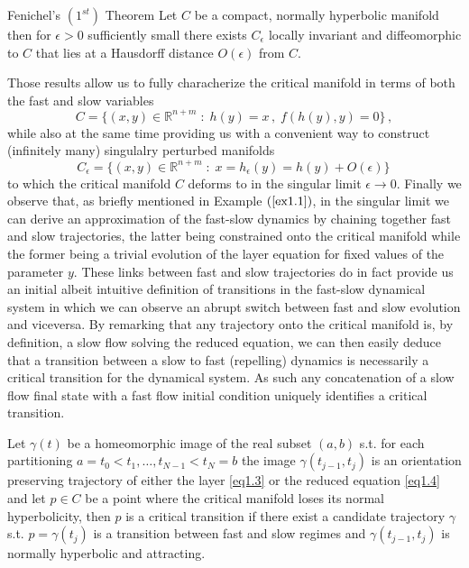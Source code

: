 \documentclass[../main.tex]{subfiles}
\begin{document}
\begin{theorem}[label=thm1.2]{Fenichel's $(1^{st})$ Theorem}{}
     Let $C$ be a compact, normally hyperbolic manifold then for $\epsilon>0$ sufficiently small there exists $C_{\epsilon}$ locally invariant and diffeomorphic to $C$ that lies at a Hausdorff distance $O(\epsilon)$ from $C$.
\end{theorem}
Those results allow us to fully characherize the critical manifold in terms of both the fast and slow variables
\begin{equation}\label{eq1.6}
        C=\{(x,y)\in \mathbb{R}^{n+m}\;:\;h(y)=x\,,\;f(h(y),y)=0\}\,,
\end{equation}
while also at the same time providing us with a convenient way to construct (infinitely many) singulalry perturbed manifolds 
\begin{equation}\label{eq1.6.2}
        C_{\epsilon}=\{(x,y)\in \mathbb{R}^{n+m}\;:\;x=h_{\epsilon}(y)=h(y)+O(\epsilon)\}\,
\end{equation}
to which the critical manifold $C$ deforms to in the singular limit $\epsilon\to0$.
Finally we observe that, as briefly mentioned in Example $(\ref{ex1.1})$, in the singular limit we can derive an approximation of the fast-slow dynamics by chaining together fast and slow trajectories, the latter being constrained onto the critical manifold while the former being a trivial evolution of the layer equation for fixed values of the parameter $y$.
These links between fast and slow trajectories do in fact provide us an initial albeit intuitive definition of transitions in the fast-slow dynamical system in which we can observe an abrupt switch between fast and slow evolution and viceversa.  
By remarking that any trajectory onto the critical manifold is, by definition, a slow flow solving the reduced equation, we can then easily deduce that a transition between a slow to fast (repelling) dynamics is necessarily a critical transition for the dynamical system. As such any concatenation of a slow flow final state with a fast flow initial condition uniquely identifies a critical transition.
\begin{definition}\label{def1.3}
        Let $\gamma(t)$ be a homeomorphic image of the real subset $(a,b)$ s.t. for each partitioning ${a=t_{0}<t_1,\dots,t_{N-1}<t_N=b}$ the image $\gamma(t_{j-1},t_j)$ is an orientation preserving trajectory of either the layer \eqref{eq1.3} or the reduced equation \eqref{eq1.4} and let $p\in C$ be a point where the critical manifold loses its normal hyperbolicity, then $p$ is a critical transition if there exist a candidate trajectory $\gamma$ s.t. $p = \gamma(t_j)$ is a transition between fast and slow regimes and $\gamma(t_{j-1},t_j)$ is normally hyperbolic and attracting.
\end{definition}
\end{document}
